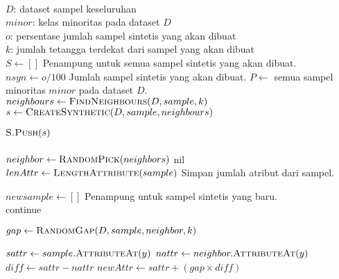 \begin{center}
	\label{alg:lnsmote}
	\begin{algorithmic}[1]
\Require \\
$ D $: dataset sampel keseluruhan \\
$ minor $: kelas minoritas pada dataset $D$ \\
$ o $: persentase jumlah sampel sintetis yang akan dibuat \\
$ k $: jumlah tetangga terdekat dari sampel yang akan dibuat
\\
	\State $ S \gets [] $
	\Comment Penampung untuk semua sampel sintetis yang akan dibuat.
	\State $ nsyn \gets o/100 $
	\Comment Jumlah sampel sintetis yang akan dibuat.
	\State $ P \gets $ semua sampel minoritas $minor$ pada dataset $D$.
	\\
		\State $ neighbours \gets \Call{FindNeighbours}{D, sample, k} $
			\State $ s \gets \Call{CreateSynthetic}{D, sample, neighbours} $

				\State $ \Call{S.Push}{s} $
			\EndIf
		\EndFor
	\EndFor
	\\
	\State {}
\EndFunction
\\
	\State $ neighbor \gets \Call{RandomPick}{neighbors} $
		\State \Return nil
	\EndIf
	\\
	\State $ lenAttr \gets \Call{LengthAttribute}{sample} $
	\Comment Simpan jumlah atribut dari sampel.

	\State $ newsample \gets [] $
	\Comment Penampung untuk sampel sintetis yang baru.
	\\
			\State continue
		\EndIf

		\State $ gap \gets \Call{RandomGap}{D, sample, neighbor, k} $

		\State $ sattr \gets sample.\Call{AttributeAt}{y} $
		\State $ nattr \gets neighbor.\Call{AttributeAt}{y} $
		\State $ diff \gets sattr - nattr $
		\State $ newAttr \gets sattr + (gap \times diff) $


\end{algorithmic}
\end{center}
